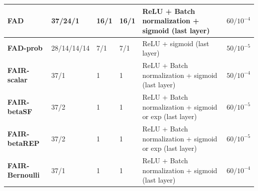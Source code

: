 \documentclass[preprint,12pt]{elsarticle}
\begin{document}
\begin{table}
\begin{adjustbox}{max width=\textwidth, totalheight = \textheight-0.1in}
\begin{tabular}{|L|L|L|L|L|L|}
			\midrule
			\textbf{FAD} & 37/24/1 & 16/1 & 16/1 & ReLU + Batch normalization  + sigmoid (last layer) & $60 / 10^{-4}$ \\
			\midrule
			\textbf{FAD-prob} & {28/14/14/14} & 7/1 & 7/1 & ReLU   + sigmoid (last layer) & $50 / 10^{-5}$ \\
			\midrule
			\textbf{FAIR-scalar} & 37/1 & 1  & 1  & ReLU + Batch normalization  + sigmoid (last layer) & $50 / 10^{-4}$ \\
			\midrule
			\textbf{FAIR-betaSF} & 37/2 & 1  & 1  & ReLU + Batch normalization  + sigmoid or exp (last layer) & $60 / 10^{-5}$ \\
			\midrule
			\textbf{FAIR-betaREP} & 37/2 & 1  & 1  & ReLU + Batch normalization  + sigmoid or exp (last layer) & $60 / 10^{-5}$ \\
			\midrule
			\textbf{FAIR-Bernoulli} & 37/1 & 1  & 1  & ReLU + Batch normalization  + sigmoid (last layer) & $60 / 10^{-4}$ \\
			\bottomrule
		\end{tabular}%
	\end{adjustbox}
	\label{tab:A2}%
\end{table}%
\end{document}
